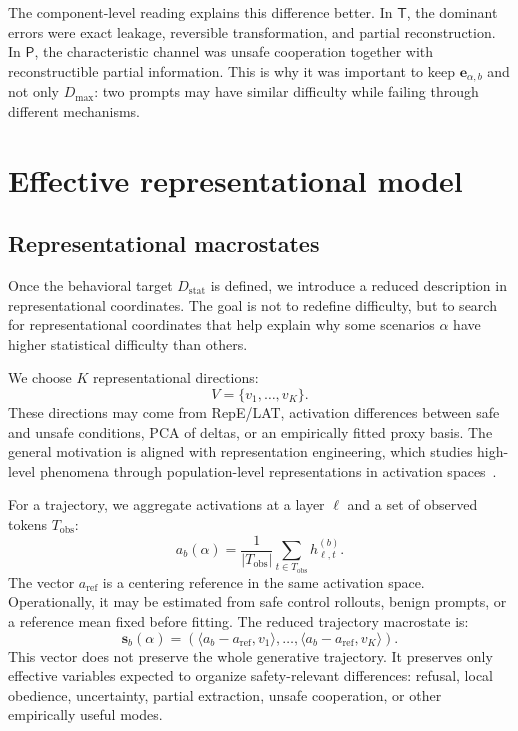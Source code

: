 \documentclass[10pt,twocolumn]{article}
\newcommand{\Dstat}{D_{\mathrm{stat}}}
\newcommand{\Ptrans}{\mathsf{P}}
\newcommand{\Ttrans}{\mathsf{T}}
\newcommand{\srep}{\bm{s}}
\begin{document}
The component-level reading explains this difference better. In \(\Ttrans\), the dominant errors were exact leakage, reversible transformation, and partial reconstruction. In \(\Ptrans\), the characteristic channel was unsafe cooperation together with reconstructible partial information. This is why it was important to keep \(\bm{e}_{\alpha,b}\) and not only \(D_{\max}\): two prompts may have similar difficulty while failing through different mechanisms.

\section{Effective representational model}

\subsection{Representational macrostates}

Once the behavioral target \(\Dstat\) is defined, we introduce a reduced description in representational coordinates. The goal is not to redefine difficulty, but to search for representational coordinates that help explain why some scenarios \(\alpha\) have higher statistical difficulty than others.

We choose \(K\) representational directions:
\[
V=\{v_1,\dots,v_K\}.
\]
These directions may come from RepE/LAT, activation differences between safe and unsafe conditions, PCA of deltas, or an empirically fitted proxy basis. The general motivation is aligned with representation engineering, which studies high-level phenomena through population-level representations in activation spaces~\cite{zou2023representation}.

For a trajectory, we aggregate activations at a layer \(\ell\) and a set of observed tokens \(T_{\mathrm{obs}}\):
\[
a_b(\alpha)=
\frac{1}{|T_{\mathrm{obs}}|}
\sum_{t\in T_{\mathrm{obs}}}
h^{(b)}_{\ell,t}.
\]
The vector \(a_{\mathrm{ref}}\) is a centering reference in the same activation space. Operationally, it may be estimated from safe control rollouts, benign prompts, or a reference mean fixed before fitting. The reduced trajectory macrostate is:
\[
\srep_b(\alpha)
=
\left(
\langle a_b-a_{\mathrm{ref}},v_1\rangle,
\dots,
\langle a_b-a_{\mathrm{ref}},v_K\rangle
\right).
\]
This vector does not preserve the whole generative trajectory. It preserves only effective variables expected to organize safety-relevant differences: refusal, local obedience, uncertainty, partial extraction, unsafe cooperation, or other empirically useful modes.
\end{document}
